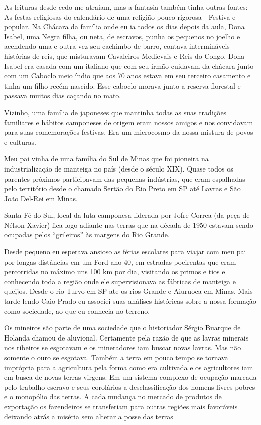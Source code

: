 As leituras desde cedo me atraiam, mas a fantasia também tinha outras
fontes: As festas religiosas do calendário de uma religião pouco
rigorosa - Festiva e popular. Na Chácara da família onde eu ia todos os
dias depois da aula, Dona Isabel, uma Negra filha, ou neta, de escravos,
punha os pequenos no joelho e acendendo uma e outra vez seu cachimbo de
barro, contava intermináveis histórias de reis, que misturavam
Cavaleiros Medievais e Reis do Congo. Dona Isabel era casada com um
italiano que com seu irmão cuidavam da chácara junto com um Caboclo meio
índio que aos 70 anos estava em seu terceiro casamento e tinha um filho
recém-nascido. Esse caboclo morava junto a reserva florestal e passava
muitos dias caçando no mato.

Vizinho, uma família de japoneses que mantinha todas as suas tradições
familiares e hábitos camponeses de origem eram nossos amigos e nos
convidavam para suas comemorações festivas. Era um microcosmo da nossa
mistura de povos e culturas.

Meu pai vinha de uma família do Sul de Minas que foi pioneira na
industrialização de manteiga no país (desde o século XIX). Quase todos
os parentes próximos participavam das pequenas indústrias, que eram
espalhadas pelo território desde o chamado Sertão do Rio Preto em SP até
Lavras e São João Del-Rei em Minas.

Santa Fé do Sul, local da luta camponesa liderada por Jofre Correa (da
peça de Nélson Xavier) fica logo adiante nas terras que na década de
1950 estavam sendo ocupadas pelos “grileiros” às margens do Rio Grande.

Desde pequeno eu esperava ansioso as férias escolares para viajar com
meu pai por longas distâncias em um Ford ano 40, em estradas poeirentas
que eram percorridas no máximo uns 100 km por dia, visitando os primos e
tios e conhecendo toda a região onde ele supervisionava as fábricas de
manteiga e queijos. Desde o rio Turvo em SP ate os rios Grande e
Aiuruoca em Minas. Mais tarde lendo Caio Prado eu associei suas análises
históricas sobre a nossa formação como sociedade, ao que eu conhecia no
terreno.

Os mineiros são parte de uma sociedade que o historiador Sérgio Buarque
de Holanda chamou de aluvional. Certamente pela razão de que as lavras
minerais nos ribeiros se esgotavam e os mineradores iam buscar novas
lavras. Mas não somente o ouro se esgotava. Também a terra em pouco
tempo se tornava imprópria para a agricultura pela forma como era
cultivada e os agricultores iam em busca de novas terras virgens. Em um
sistema complexo de ocupação marcada pelo trabalho escravo e seus
corolários a desclassificação dos homens livres pobres e o monopólio das
terras. A cada mudança no mercado de produtos de exportação os
fazendeiros se transferiam para outras regiões mais favoráveis deixando
atrás a miséria sem alterar a posse das terras

